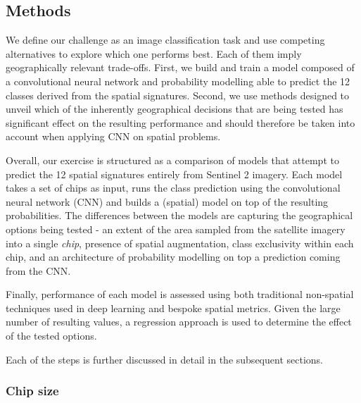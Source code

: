 \subsection{Methods}


We define our challenge as an image classification task and use competing alternatives
to explore which one performs best. Each of them imply geographically relevant
trade-offs. First, we build and train a model composed of a convolutional neural network
and probability modelling able to predict the 12 classes derived from the spatial
signatures. Second, we use methods designed to unveil which of the inherently
geographical decisions that are being tested has significant effect on the resulting
performance and should therefore be taken into account when applying CNN on spatial
problems.

Overall, our exercise is structured as a comparison of models that attempt to
predict the 12 spatial signatures entirely from Sentinel 2 imagery. Each model takes
a set of chips as input, runs the class prediction using the convolutional neural
network (CNN) and builds a (spatial) model on top of the resulting probabilities. The
differences between the models are capturing the geographical options being tested - an
extent of the area sampled from the satellite imagery into a single \textit{chip},
presence of spatial augmentation, class exclusivity within each chip, and an
architecture of probability modelling on top a prediction coming from the CNN.

Finally, performance of each model is assessed using both traditional non-spatial
techniques used in deep learning and bespoke spatial metrics. Given the large number of
resulting values, a regression approach is used to determine the effect of the tested
options.

Each of the steps is further discussed in detail in the subsequent sections.

\subsubsection{Chip size}


